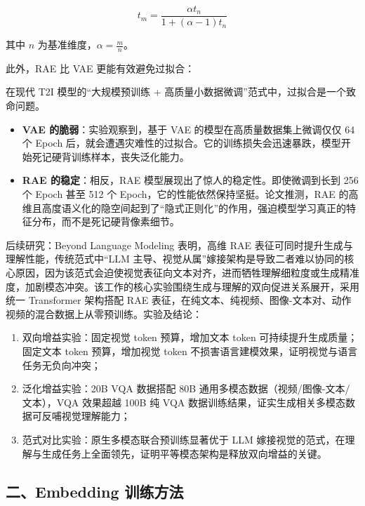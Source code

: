 \[
t_m=\frac{\alpha t_n}{1+(\alpha-1)t_n}
\]

其中 \(n\) 为基准维度，\(\alpha=\frac{m}{n}\)。

此外，RAE 比 VAE 更能有效避免过拟合：

在现代 T2I 模型的``大规模预训练 + 高质量小数据微调''范式中，过拟合是一个致命问题。

\begin{itemize}
\tightlist
\item
  \textbf{VAE 的脆弱}：实验观察到，基于 VAE 的模型在高质量数据集上微调仅仅 64 个 Epoch 后，就会遭遇灾难性的过拟合。它的训练损失会迅速暴跌，模型开始死记硬背训练样本，丧失泛化能力。
\item
  \textbf{RAE 的稳定}：相反，RAE 模型展现出了惊人的稳定性。即使微调到长到 256 个 Epoch 甚至 512 个 Epoch，它的性能依然保持坚挺。论文推测，RAE 的高维且高度语义化的隐空间起到了``隐式正则化''的作用，强迫模型学习真正的特征分布，而不是死记硬背像素细节。
\end{itemize}

后续研究：Beyond Language Modeling 表明，高维 RAE 表征可同时提升生成与理解性能，传统范式中``LLM 主导、视觉从属''嫁接架构是导致二者难以协同的核心原因，因为该范式会迫使视觉表征向文本对齐，进而牺牲理解细粒度或生成精准度，加剧模态冲突。该工作的核心实验围绕生成与理解的双向促进关系展开，采用统一 Transformer 架构搭配 RAE 表征，在纯文本、纯视频、图像-文本对、动作视频的混合数据上从零预训练。实验及结论：

\begin{enumerate}
\def\labelenumi{\arabic{enumi}.}
\tightlist
\item
  双向增益实验：固定视觉 token 预算，增加文本 token 可持续提升生成质量；固定文本 token 预算，增加视觉 token 不损害语言建模效果，证明视觉与语言任务无负向冲突；
\item
  泛化增益实验：20B VQA 数据搭配 80B 通用多模态数据（视频/图像-文本/文本），VQA 效果超越 100B 纯 VQA 数据训练结果，证实生成相关多模态数据可反哺视觉理解能力；
\item
  范式对比实验：原生多模态联合预训练显著优于 LLM 嫁接视觉的范式，在理解与生成任务上全面领先，证明平等模态架构是释放双向增益的关键。
\end{enumerate}

\hypertarget{ux4e8cembedding-ux8badux7ec3ux65b9ux6cd5}{%
\subsection{二、Embedding 训练方法}\label{ux4e8cembedding-ux8badux7ec3ux65b9ux6cd5}}

